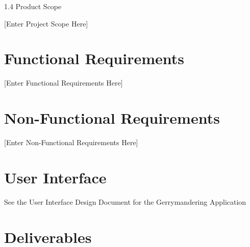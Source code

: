 \documentclass{article}
\begin{document}
1.4 Product Scope

\vspace{2.5mm}

\begin{addmargin}[4em]{0em}

[Enter Project Scope Here]

\end{addmargin}

\vspace{2.5mm}




\section{Functional Requirements}\label{sec:functionalReq}

\vspace{2.5mm}

\begin{addmargin}[4em]{0em}

[Enter Functional Requirements Here]

\end{addmargin}

\vspace{2.5mm}




\section{Non-Functional Requirements}\label{sec:non-functionalReq}
\vspace{2.5mm}

\begin{addmargin}[4em]{0em}

[Enter Non-Functional Requirements Here]

\end{addmargin}

\vspace{2.5mm}




\section{User Interface}\label{sec:ui}

See the User Interface Design Document for the Gerrymandering Application





\section{Deliverables}\label{sec:deliverables}
\end{document}
